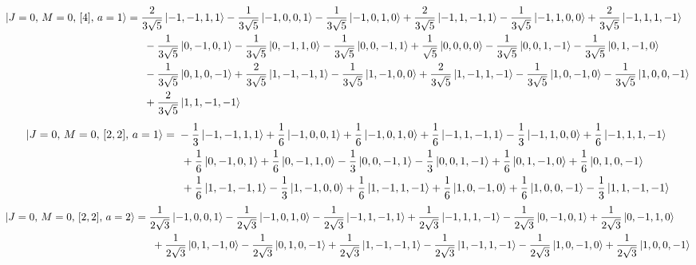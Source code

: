 \documentclass{article}
\begin{document}
{\small
\begin{equation*}
\begin{aligned}
\ket{J=0,\,M=0,\,[4],\,a=1} = \; &\frac{2}{3\sqrt{5}} \ket{-1,-1,1,1} - \frac{1}{3\sqrt{5}} \ket{-1,0,0,1} - \frac{1}{3\sqrt{5}} \ket{-1,0,1,0} + \frac{2}{3\sqrt{5}} \ket{-1,1,-1,1} - \frac{1}{3\sqrt{5}} \ket{-1,1,0,0} + \frac{2}{3\sqrt{5}} \ket{-1,1,1,-1} \\
  & \; - \frac{1}{3\sqrt{5}} \ket{0,-1,0,1} - \frac{1}{3\sqrt{5}} \ket{0,-1,1,0} - \frac{1}{3\sqrt{5}} \ket{0,0,-1,1} + \frac{1}{\sqrt{5}} \ket{0,0,0,0} - \frac{1}{3\sqrt{5}} \ket{0,0,1,-1} - \frac{1}{3\sqrt{5}} \ket{0,1,-1,0} \\
  & \; - \frac{1}{3\sqrt{5}} \ket{0,1,0,-1} + \frac{2}{3\sqrt{5}} \ket{1,-1,-1,1} - \frac{1}{3\sqrt{5}} \ket{1,-1,0,0} + \frac{2}{3\sqrt{5}} \ket{1,-1,1,-1} - \frac{1}{3\sqrt{5}} \ket{1,0,-1,0} - \frac{1}{3\sqrt{5}} \ket{1,0,0,-1} \\
  & \; + \frac{2}{3\sqrt{5}} \ket{1,1,-1,-1}
\end{aligned}
\end{equation*}}
{\small
\begin{equation*}
\begin{aligned}
\ket{J=0,\,M=0,\,[2,2],\,a=1} = \; &- \frac{1}{3} \ket{-1,-1,1,1} + \frac{1}{6} \ket{-1,0,0,1} + \frac{1}{6} \ket{-1,0,1,0} + \frac{1}{6} \ket{-1,1,-1,1} - \frac{1}{3} \ket{-1,1,0,0} + \frac{1}{6} \ket{-1,1,1,-1} \\
  & \; + \frac{1}{6} \ket{0,-1,0,1} + \frac{1}{6} \ket{0,-1,1,0} - \frac{1}{3} \ket{0,0,-1,1} - \frac{1}{3} \ket{0,0,1,-1} + \frac{1}{6} \ket{0,1,-1,0} + \frac{1}{6} \ket{0,1,0,-1} \\
  & \; + \frac{1}{6} \ket{1,-1,-1,1} - \frac{1}{3} \ket{1,-1,0,0} + \frac{1}{6} \ket{1,-1,1,-1} + \frac{1}{6} \ket{1,0,-1,0} + \frac{1}{6} \ket{1,0,0,-1} - \frac{1}{3} \ket{1,1,-1,-1}
\end{aligned}
\end{equation*}}
{\small
\begin{equation*}
\begin{aligned}
\ket{J=0,\,M=0,\,[2,2],\,a=2} = \; &\frac{1}{2\sqrt{3}} \ket{-1,0,0,1} - \frac{1}{2\sqrt{3}} \ket{-1,0,1,0} - \frac{1}{2\sqrt{3}} \ket{-1,1,-1,1} + \frac{1}{2\sqrt{3}} \ket{-1,1,1,-1} - \frac{1}{2\sqrt{3}} \ket{0,-1,0,1} + \frac{1}{2\sqrt{3}} \ket{0,-1,1,0} \\
  & \; + \frac{1}{2\sqrt{3}} \ket{0,1,-1,0} - \frac{1}{2\sqrt{3}} \ket{0,1,0,-1} + \frac{1}{2\sqrt{3}} \ket{1,-1,-1,1} - \frac{1}{2\sqrt{3}} \ket{1,-1,1,-1} - \frac{1}{2\sqrt{3}} \ket{1,0,-1,0} + \frac{1}{2\sqrt{3}} \ket{1,0,0,-1}
\end{aligned}
\end{equation*}}
\newpage
\end{document}
